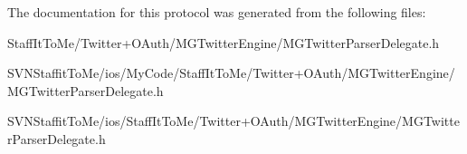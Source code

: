 \-The documentation for this protocol was generated from the following files\-:\begin{DoxyCompactItemize}
\item 
\-Staff\-It\-To\-Me/\-Twitter+\-O\-Auth/\-M\-G\-Twitter\-Engine/\-M\-G\-Twitter\-Parser\-Delegate.\-h\item 
\-S\-V\-N\-Staffit\-To\-Me/ios/\-My\-Code/\-Staff\-It\-To\-Me/\-Twitter+\-O\-Auth/\-M\-G\-Twitter\-Engine/\-M\-G\-Twitter\-Parser\-Delegate.\-h\item 
\-S\-V\-N\-Staffit\-To\-Me/ios/\-Staff\-It\-To\-Me/\-Twitter+\-O\-Auth/\-M\-G\-Twitter\-Engine/\-M\-G\-Twitter\-Parser\-Delegate.\-h\end{DoxyCompactItemize}
